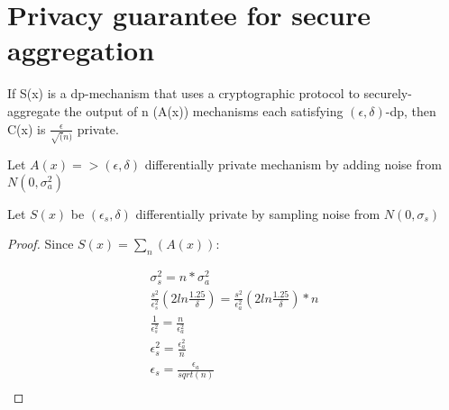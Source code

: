 \section{Privacy guarantee for secure aggregation}

\begin{theorem}
If S(x) is a dp-mechanism that uses a cryptographic protocol to securely-aggregate the output of n (A(x)) mechanisms each satisfying $(\epsilon,\delta)$-dp, then C(x) is $\frac{\epsilon}{\sqrt(n)}$ private.
\end{theorem}

Let $A(x) => (\epsilon, \delta)$ differentially private mechanism  by adding noise from $N(0, \sigma_{a}^{2})$

Let $S(x)$ be $(\epsilon_s,\delta)$ differentially private by sampling noise from $N(0, \sigma_{s})$

\begin{proof}
Since $S(x) = \sum_{n}(A(x))$:

\begin{gather*}
\sigma_{s}^{2} = n*\sigma_{a}^{2}\\
\frac{s^{2}}{\epsilon_s^{2}}(2ln\frac{1.25}{\delta}) = \frac{s^{2}}{\epsilon_a^{2}}(2ln\frac{1.25}{\delta}) * n \\
\frac{1}{\epsilon_s^{2}} = \frac{n}{\epsilon_a^{2}} \\
\epsilon_s^{2} = \frac{\epsilon_a^{2}}{n} \\
\epsilon_s = \frac{\epsilon_a}{sqrt(n)} \\
\end{gather*}

\end{proof}






